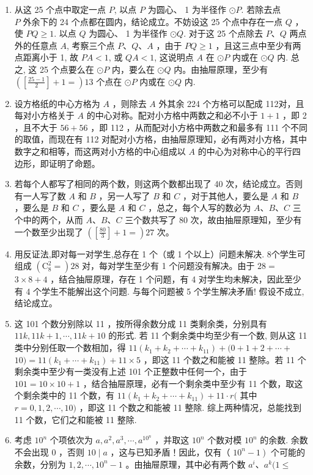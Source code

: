 \documentclass[10pt]{article}
\begin{document}
\begin{enumerate}
  \item 从这 25 个点中取定一点 $P$, 以点 $P$ 为圆心、 1 为半径作 $\odot P$. 若除去点\\
$P$ 外余下的 24 个点都在圆内，结论成立。不妨设这 25 个点中存在一点 $Q$ ，使 $P Q \geqslant 1$. 以点 $Q$ 为圆心、 1 为半径作 $\odot Q$. 对于这 25 个点除去 $P 、 Q$ 两点外的任意点 $A$, 考察三个点 $P 、 Q 、 A$ ，由于 $P Q \geqslant 1$ ，且这三点中至少有两点距离小于 1, 故 $P A<1$, 或 $Q A<1$, 这说明点 $A$ 在 $\odot P$ 内或在 $\odot Q$ 内. 总之, 这 25 个点要么在 $\odot P$ 内，要么在 $\odot Q$ 内。由抽屉原理，至少有 $\left(\left[\frac{25-1}{2}\right]+1=\right) 13$ 个点在 $\odot P$ 内或在 $\odot Q$ 内.
  \item 设方格纸的中心方格为 $A$ ，则除去 $A$ 外其余 224 个方格可以配成 112对，且每对小方格关于 $A$ 的中心对称。配对小方格中两数之和必不小于 $1+1$ ，即 2 ，且不大于 $56+56$ ，即 112 ，从而配对小方格中两数之和最多有 111 个不同的取值，而现在有 112 对配对小方格，由抽屉原理知，必有两对小方格，其中数字之和相等，而这两对小方格的中心组成以 $A$ 的中心为对称中心的平行四边形，即证明了命题。
  \item 若每个人都写了相同的两个数，则这两个数都出现了 40 次，结论成立。否则有一人写了数 $A$ 和 $B$ ，另一人写了 $B$ 和 $C$ ，对于其他人，要么是 $A$ 和 $B$ ，要么是 $B$ 和 $C$ ，要么是 $A$ 和 $C$ ，总之，每个人写的数必为 $A 、 B 、 C$ 三个中的两个，从而 $A 、 B 、 C$ 三个数共写了 80 次，故由抽屉原理知，至少有一个数至少出现了 $\left(\left[\frac{80}{3}\right]+1=\right) 27$ 次。
  \item 用反证法,即对每一对学生,总存在 1 个（或 1 个以上）问题未解决. 8个学生可组成 $\left(\mathrm{C}_{8}^{2}=\right) 28$ 对，每对学生至少有 1 个问题没有解决。由于 $28=$ $3 \times 8+4$ ，结合抽屉原理，存在 1 个问题，有 4 对学生均未解决，因此至少有 4 个学生不能解出这个问题. 与每个问题被 5 个学生解决矛盾! 假设不成立, 结论成立。
  \item 这 101 个数分别除以 11 ，按所得余数分成 11 类剩余类，分别具有 $11 k, 11 k+1, \cdots, 11 k+10$ 的形式. 若 11 个剩余类中均至少有一个数, 则从这 11 类中分别任取一个数相加，得 $11\left(k_{1}+k_{2}+\cdots+k_{11}\right)+(0+1+2+\cdots+$ $10)=11\left(k_{1}+\cdots+k_{11}\right)+11 \times 5$ ，即这 11 个数之和能被 11 整除。若 11 个剩余类中至少有一类没有上述 101 个正整数中任何一个，由于 $101=10 \times 10+1$ ，结合抽屉原理，必有一个剩余类中至少有 11 个数，取这个剩余类中的 11 个数，有 $11\left(k_{1}+k_{2}+\cdots+k_{11}\right)+11 \cdot r($ 其中 $r=0,1,2, \cdots, 10)$ ，即这 11 个数之和能被 11 整除. 综上两种情况，总能找到 11 个数，它们之和能被 11 整除.
  \item 考虑 $10^{n}$ 个项依次为 $a, a^{2}, a^{3}, \cdots, a^{10^{n}}$ ，并取这 $10^{n}$ 个数对模 $10^{n}$ 的余数. 余数不会出现 0 ，否则 $10 \mid a$ ，这与已知矛盾！因此，仅有（ $\left.10^{n}-1\right)$ 个可能的余数，分别为 $1,2, \cdots, 10^{n}-1$ 。由抽屉原理，其中必有两个数 $a^{i} 、 a^{k}(1 \leqslant$\\

\end{enumerate}
\end{document}
